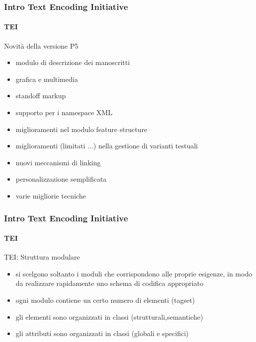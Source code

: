 \begin{frame}
	\frametitle{Intro Text Encoding Initiative}
	\framesubtitle{TEI}
	\addtocounter{nframe}{1}

	\begin{block}{Novità della versione P5}
		\begin{itemize}
			\item modulo di descrizione dei manoscritti
			\item grafica e multimedia
			\item standoff markup
			\item supporto per i namespace XML
			\item miglioramenti nel modulo feature structure
			\item miglioramenti (limitati ...) nella gestione di varianti testuali
			\item nuovi meccanismi di linking
			\item personalizzazione semplificata
			\item varie migliorie tecniche
		\end{itemize}

	\end{block}

\end{frame}


\begin{frame}
	\frametitle{Intro Text Encoding Initiative}
	\framesubtitle{TEI}
	\addtocounter{nframe}{1}

	\begin{block}{TEI: Struttura modulare}
		\begin{itemize}
			\item si scelgono soltanto i moduli che corrispondono alle proprie esigenze, in modo da realizzare rapidamente uno schema di codifica appropriato
			\item ogni modulo contiene un certo numero di elementi (tagset)
			\item gli elementi sono organizzati in classi (strutturali,semantiche)
			\item gli attributi sono organizzati in classi (globali e specifici)
		\end{itemize}

	\end{block}

\end{frame}




